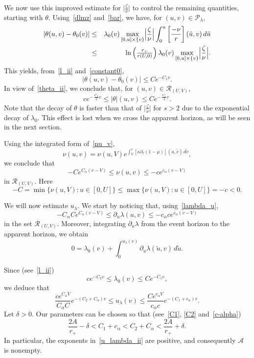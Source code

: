 \documentclass[a4paper,11pt,oneside,reqno]{amsart}
\newcommand{\s}{s}
\newcommand{\cal}{\mathcal}
\newcommand{\ruv}{{\cal R}_{(U,V)}}
\begin{document}
We now use this improved estimate for $\bigl|\frac{\zeta}{\nu}\bigr|$ to control the remaining quantities, starting with $\theta$. Using~\eqref{dlmz} and~\eqref{bar}, we have, for $(u,v)\in{\cal P}_\lambda$,
\begin{eqnarray*}
|\theta(u,v)-\theta_0(v)|&\leq& \lambda_0(v)\max_{[0,u]\times\{v\}}\Bigl|\frac{\zeta}{\nu}\Bigr|
\int_0^u\left[\frac{-\nu}{r}\right](\tilde u,v)\,d\tilde u\\
&\leq&\ln\left({\textstyle\frac{r_+}{r(U,0)}}\right)
\lambda_0(v)\max_{[0,u]\times\{v\}}\Bigl|\frac{\zeta}{\nu}\Bigr|.
\end{eqnarray*}
This yields, from~\eqref{l_ii} and~\eqref{constant0},
$$
|\theta(u,v)-\theta_0(v)|\leq Ce^{-C_1v}.
$$
In view of~\eqref{theta_ii}, we conclude that, for $(u,v)\in\ruv$,
\begin{equation}\label{theta_l_ii}
ce^{-\,\frac{C_2}{2}v}\leq|\theta|(u,v)\leq Ce^{-\,\frac{C_1}{2}v}.
\end{equation}
Note that the decay of $\theta$ is faster than that of $\bigl|\frac{\zeta}{\nu}\bigr|$ for $\s>2$ due to the exponential decay of $\lambda_0$. This effect is lost when we cross the apparent horizon, as will be seen in the next section.


Using the integrated form of~\eqref{nu_v},
$$
\nu(u,v)=\nu(u,V)e^{\int_V^v[\kappa\partial_r(1-\mu)](u,\tilde v)\,d\tilde v},
$$
we conclude that
\begin{equation}\label{nu_A}
-Ce^{C_\alpha (v-V)}\leq\nu(u,v)\leq-ce^{c_\alpha (v-V)}
\end{equation}
in $\ruv$.
Here $$-C=\min\{\nu(u,V):u\in[0,U]\}\leq\max\{\nu(u,V):u\in[0,U]\}=-c<0.$$

We will now estimate $u_\lambda$. We start by noticing that, using~\eqref{lambda_u},
$$
-C_\alpha Ce^{C_\alpha (v-V)}\leq\partial_u\lambda(u,v)\leq-c_\alpha c e^{c_\alpha (v-V)}
$$
in the set $\ruv$. Moreover, integrating $\partial_u\lambda$ from the event horizon to the apparent horizon, we obtain
\begin{equation}\label{lambda}
0=\lambda_0(v)+\int_0^{u_\lambda(v)}\partial_u\lambda(\tilde u,v)\,d\tilde u.
\end{equation}

Since (see~\eqref{l_ii})
$$
ce^{-C_2v}\leq\lambda_0(v)\leq Ce^{-C_1v},
$$
we deduce that
\begin{equation}\label{u_lambda_ii}
\frac{ce^{C_\alpha V}}{C_\alpha C} e^{-(C_2+C_\alpha)v}\leq u_\lambda(v)\leq
\frac{Ce^{c_\alpha V}}{c_\alpha c} e^{-(C_1+c_\alpha)v}.
\end{equation}
Let $\delta>0$. Our parameters can be chosen so that (see~\eqref{C1}, \eqref{C2} and~\eqref{c-alpha})
$$
\frac{2A}{r_+}-\delta<C_1+c_\alpha< C_2+C_\alpha<\frac{2A}{r_+}+\delta.
$$
In particular, the exponents in~\eqref{u_lambda_ii} are positive, and consequently ${\cal A}$ is nonempty.
\end{document}
